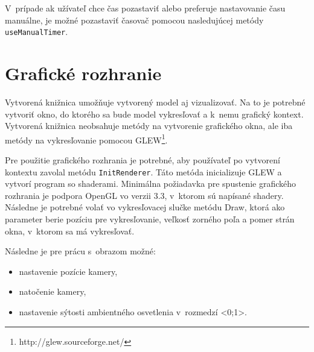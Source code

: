 V~prípade ak užívateľ chce čas pozastaviť alebo preferuje nastavovanie času manuálne, je možné pozastaviť časovač pomocou nasledujúcej metódy \texttt{useManualTimer}.

\section{Grafické rozhranie}
Vytvorená knižnica umožňuje vytvorený model aj vizualizovať. Na to je potrebné vytvoriť okno, do ktorého sa bude model vykresľovať a k~nemu grafický kontext. Vytvorená knižnica neobsahuje metódy na vytvorenie grafického okna, ale iba metódy na vykresľovanie  pomocou GLEW\footnote{http://glew.sourceforge.net/}.

Pre použitie grafického rozhrania je potrebné, aby používateľ po vytvorení kontextu zavolal metódu \texttt{InitRenderer}.
Táto metóda inicializuje GLEW a vytvorí program so shaderami.  Minimálna požiadavka pre spustenie grafického rozhrania je podpora OpenGL vo verzii 3.3, v~ktorom sú napísané shadery.
Následne je potrebné volať vo vykresľovacej slučke metódu Draw, ktorá ako parameter berie pozíciu pre vykresľovanie, veľkosť zorného poľa a pomer strán okna, v~ktorom sa má vykresľovať.

Následne je pre prácu s~obrazom možné:
\begin{itemize}
\item nastavenie pozície kamery,
\item natočenie kamery,
\item nastavenie sýtosti ambientného osvetlenia v~rozmedzí <0;1>.
\end{itemize}





